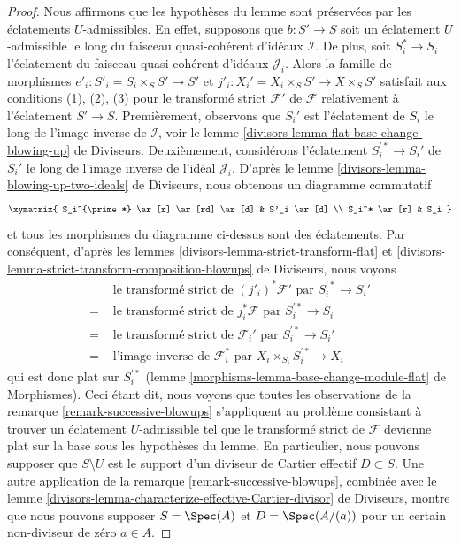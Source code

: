 \begin{proof}
Nous affirmons que les hypothèses du lemme sont préservées par les éclatements $U$-admissibles.
En effet, supposons que $b : S' \to S$ soit un éclatement $U$-admissible le long du
faisceau quasi-cohérent d'idéaux $\mathcal{I}$. De plus, soit $S^*_i \to S_i$
l'éclatement du faisceau quasi-cohérent d'idéaux $\mathcal{J}_i$.
Alors la famille de morphismes $e'_i : S'_i = S_i \times_S S' \to S'$
et $j'_i : X_i' = X_i \times_S S' \to X \times_S S'$ satisfait aux conditions
(1), (2), (3) pour le transformé strict $\mathcal{F}'$ de $\mathcal{F}$
relativement à l'éclatement $S' \to S$. Premièrement, observons que $S_i'$ est
l'éclatement de $S_i$ le long de l'image inverse de $\mathcal{I}$, voir le
lemme \ref{divisors-lemma-flat-base-change-blowing-up} de Diviseurs.
Deuxièmement, considérons l'éclatement
$S_i^{\prime *} \to S_i'$ de $S_i'$ le long de l'image inverse de l'idéal
$\mathcal{J}_i$.
D'après le lemme \ref{divisors-lemma-blowing-up-two-ideals} de Diviseurs,
nous obtenons un diagramme commutatif
$$
\xymatrix{
S_i^{\prime *} \ar[r] \ar[rd] \ar[d] & S'_i \ar[d] \\
S_i^* \ar[r] & S_i
}
$$
et tous les morphismes du diagramme ci-dessus sont des éclatements. Par conséquent, d'après les
lemmes \ref{divisors-lemma-strict-transform-flat} et
\ref{divisors-lemma-strict-transform-composition-blowups} de Diviseurs,
nous voyons
\begin{align*}
& \text{ le transformé strict de }(j'_i)^*\mathcal{F}'\text{ par }
S_i^{\prime *} \to S_i' \\
= &
\text{ le transformé strict de }j_i^*\mathcal{F}\text{ par }
S_i^{\prime *} \to S_i \\
= &
\text{ le transformé strict de }\mathcal{F}_i'\text{ par }
S_i^{\prime *} \to S_i' \\
= &
\text{ l'image inverse de }\mathcal{F}_i^*\text{ par }
X_i \times_{S_i} S_i^{\prime *} \to X_i
\end{align*}
qui est donc plat sur $S_i^{\prime *}$
(lemme \ref{morphisms-lemma-base-change-module-flat} de Morphismes).
Ceci étant dit, nous voyons que toutes les observations de la
remarque \ref{remark-successive-blowups} s'appliquent au
problème consistant à trouver un éclatement $U$-admissible tel que le
transformé strict de $\mathcal{F}$ devienne plat sur la base
sous les hypothèses du lemme. En particulier, nous pouvons supposer
que $S \setminus U$ est le support d'un diviseur de Cartier effectif
$D \subset S$. Une autre application de la remarque \ref{remark-successive-blowups},
combinée avec le
lemme \ref{divisors-lemma-characterize-effective-Cartier-divisor} de Diviseurs,
montre que nous pouvons supposer $S = \Spec(A)$ et $D = \Spec(A/(a))$
pour un certain non-diviseur de zéro $a \in A$.


\end{proof}
